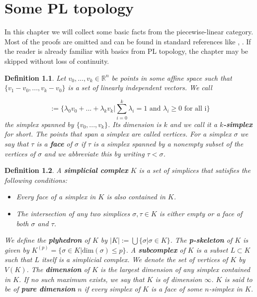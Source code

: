 \documentclass[11pt]{book}
\newtheorem{definition}{Definition}
\begin{document}
\tableofcontents

\chapter{Some PL topology}
\label{sec:Einleitung}

In this chapter we will collect some basic facts from the piecewise-linear category. Most of the proofs are omitted and can be found in standard references like \cite{pltopo}, \cite{hatcher}. If the reader is already familiar with basics from PL topology, the chapter may be skipped without loss of continuity.

\begin{definition}
Let $v_0,...,v_k \in \mathbb{R}^n$ be points in some affine space such that $\{ v_1-v_0,...,v_k-v_0 \}$ is a set of linearly independent vectors. We call

\begin{equation*}
[v_0,...,v_k] := \Biggl \{  \lambda_0v_0+...+ \lambda_kv_k \Bigg |  \sum_{i=0}^k \lambda_i =1 \text{ and } \lambda_i \geq 0 \text{ for all i} \Biggr \}
\end{equation*}
the simplex spanned by $\{v_0,...,v_k \}$. Its dimension is $k$ and we call it a \textbf{$k$-simplex} for short. The points that span a simplex are called vertices. For a simplex $\sigma$ we say that $\tau$ is a \textbf{face} of $\sigma$ if $\tau$ is a simplex spanned by a nonempty subset of the vertices of $\sigma$ and we abbreviate this by writing $\tau < \sigma$.
\end{definition}

\begin{definition}
A \textbf{simplicial complex} $K$ is a set of simplices that satisfies the following conditions:

\begin{itemize}
\item Every face of a simplex in $K$ is also contained in $K$.
\item The intersection of any two simplices $\sigma, \tau \in K$ is either empty or a face of both $\sigma$ and $\tau$.
\end{itemize}

We define the \textbf{plyhedron} of $K$ by $|K|:= \bigcup \{ \sigma | \sigma \in K \}$. The \textbf{p-skeleton} of $K$ is given by $K^{(p)}= \{ \sigma \in  K | \text{dim}(\sigma) \leq p \}$. A \textbf{subcomplex} of $K$ is a subset $L \subset K$ such that $L$ itself is a simplicial complex. We denote the set of vertices of $K$ by $V(K)$. The \textbf{dimension} of $K$ is the largest dimension of any simplex contained in $K$. If no such maximum exists, we say that $K$ is of dimension $\infty$. $K$ is said to be of \textbf{pure dimension} $n$ if every simplex of $K$ is a face of some $n$-simplex in $K$.
\end{definition}
\end{document}
